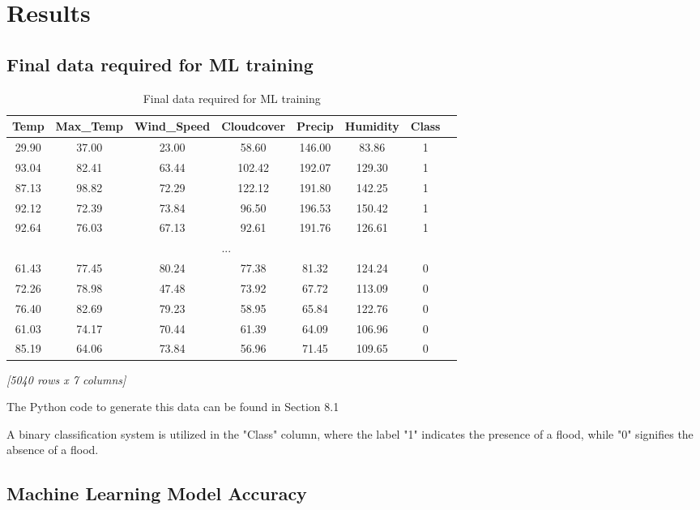 \documentclass[a4paper,12pt]{report}
\begin{document}
\chapter{Results}

\section{Final data required for ML training}

\begin{table}[ht]
\centering
\begin{center}
\begin{longtable}{cccccccc}
\toprule
\textbf{Temp} & \textbf{Max\_Temp} & \textbf{Wind\_Speed} & \textbf{Cloudcover} & \textbf{Precip} & \textbf{Humidity} & \textbf{Class} \\
\midrule
29.90 & 37.00 & 23.00 & 58.60 & 146.00 & 83.86 & 1 \\
93.04 & 82.41 & 63.44 & 102.42 & 192.07 & 129.30 & 1 \\
87.13 & 98.82 & 72.29 & 122.12 & 191.80 & 142.25 & 1 \\
92.12 & 72.39 & 73.84 & 96.50 & 196.53 & 150.42 & 1 \\
92.64 & 76.03 & 67.13 & 92.61 & 191.76 & 126.61 & 1 \\
\multicolumn{7}{c}{...} \\
61.43 & 77.45 & 80.24 & 77.38 & 81.32 & 124.24 & 0 \\
72.26 & 78.98 & 47.48 & 73.92 & 67.72 & 113.09 & 0 \\
76.40 & 82.69 & 79.23 & 58.95 & 65.84 & 122.76 & 0 \\
61.03 & 74.17 & 70.44 & 61.39 & 64.09 & 106.96 & 0 \\
85.19 & 64.06 & 73.84 & 56.96 & 71.45 & 109.65 & 0 \\
\bottomrule
\end{longtable}
\small\textit{[5040 rows x 7 columns]}
\end{center}
\caption{Final data required for ML training}
\end{table}

The Python code to generate this data can be found in Section 8.1

A binary classification system is utilized in the "Class" column, where the label "1" indicates the presence of a flood, while "0" signifies the absence of a flood.

\section{Machine Learning Model Accuracy}
\end{document}
